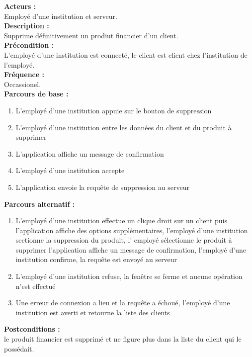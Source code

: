 \documentclass[../rapport.tex]{subfiles}
\begin{document}
\textbf{Acteurs :} \\
Employé d'une institution et serveur. \\

\textbf{Description :} \\
Supprime définitivement un prodiut financier d'un client. \\

\textbf{Précondition :} \\
L'employé d'une institution est connecté, le client est client chez l'institution de l'employé. \\

\textbf{Fréquence :} \\
Occassionel. \\

\textbf{Parcours de base :} \\
\begin{enumerate}
    \item L’employé d’une institution appuie sur le bouton de suppression
    \item L’employé d’une institution  entre les données du client et du produit à supprimer
    \item L’application affiche un message de confirmation
    \item L’employé d’une institution accepte
    \item L’application envoie la requête de suppression au serveur
\end{enumerate}
\bigskip

\textbf{Parcours alternatif :}
\begin{enumerate}
    \item L’employé d’une institution effectue un clique droit sur un client puis l’application affiche des options supplémentaires, l’employé d’une institution sectionne la suppression du produit, l’ employé sélectionne le produit à supprimer l’application affiche un message de confirmation, l’employé d’une institution confirme, la requête est envoyé au serveur 
    \item L’employé d’une institution refuse, la fenêtre se ferme et aucune opération n’est effectué
    \item Une erreur de connexion a lieu et la requête a échoué, l’employé d’une institution  est averti et retourne la liste des clients
\end{enumerate}

\textbf{Postconditions :} \\
le produit financier est supprimé et ne figure plus dans la liste du client qui le possédait. \\
\end{document}
